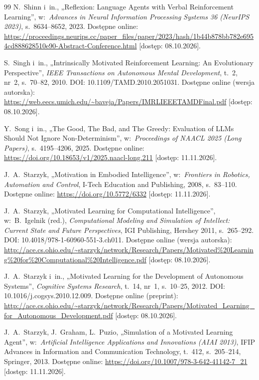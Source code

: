 \begin{thebibliography}{99}
 N.~Shinn i~in., „Reflexion: Language Agents with Verbal Reinforcement Learning”, w:~\textit{Advances in Neural Information Processing Systems 36 (NeurIPS 2023)}, s.~8634--8652, 2023. Dostępne online: \url{https://proceedings.neurips.cc/paper_files/paper/2023/hash/1b44b878bb782e6954cd888628510e90-Abstract-Conference.html} [dostęp: 08.10.2026].

 S.~Singh i~in., „Intrinsically Motivated Reinforcement Learning: An Evolutionary Perspective”, \textit{IEEE Transactions on Autonomous Mental Development}, t.~2, nr~2, s.~70--82, 2010. DOI: 10.1109/TAMD.2010.2051031. Dostępne online (wersja autorska): \url{https://web.eecs.umich.edu/~baveja/Papers/IMRLIEEETAMDFinal.pdf} [dostęp: 08.10.2026].

 Y.~Song i~in., „The Good, The Bad, and The Greedy: Evaluation of {LLMs} Should Not Ignore Non-Determinism”, w:~\textit{Proceedings of NAACL 2025 (Long Papers)}, s.~4195--4206, 2025. Dostępne online: \url{https://doi.org/10.18653/v1/2025.naacl-long.211} [dostęp: 11.11.2026].

 J.~A.~Starzyk, „Motivation in Embodied Intelligence”, w:~\textit{Frontiers in Robotics, Automation and Control}, I-Tech Education and Publishing, 2008, s.~83--110. Dostępne online: \url{https://doi.org/10.5772/6332} [dostęp: 11.11.2026].

 J.~A.~Starzyk, „Motivated Learning for Computational Intelligence”, w:~B.~Igelnik (red.), \textit{Computational Modeling and Simulation of Intellect: Current State and Future Perspectives}, IGI Publishing, Hershey 2011, s.~265--292. DOI: 10.4018/978-1-60960-551-3.ch011. Dostępne online (wersja autorska): \url{http://ace.cs.ohio.edu/~starzyk/network/Research/Papers/Motivated%20Learning%20for%20Computational%20Intelligence.pdf} [dostęp: 08.10.2026].

 J.~A.~Starzyk i~in., „Motivated Learning for the Development of Autonomous Systems”, \textit{Cognitive Systems Research}, t.~14, nr~1, s.~10--25, 2012. DOI: 10.1016/j.cogsys.2010.12.009. Dostępne online (preprint): \url{http://ace.cs.ohio.edu/~starzyk/network/Research/Papers/Motivated_Learning_for_Autonomous_Development.pdf} [dostęp: 08.10.2026].

 J.~A.~Starzyk, J.~Graham, L.~Puzio, „Simulation of a Motivated Learning Agent”, w:~\textit{Artificial Intelligence Applications and Innovations (AIAI 2013)}, IFIP Advances in Information and Communication Technology, t.~412, s.~205--214, Springer, 2013. Dostępne online: \url{https://doi.org/10.1007/978-3-642-41142-7_21} [dostęp: 11.11.2026].


\end{thebibliography}

